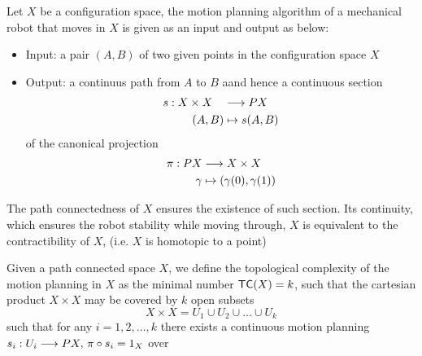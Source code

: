\begin{defn}
    Let $X$ be a configuration space, the motion planning algorithm of a mechanical robot that moves in $X$ is given as an input and output as below:
    \begin{itemize}
        \item Input: a pair $(A,B)$ of two given points in the configuration space $X$
        \item Output: a continuus path from $A$ to $B$ aand hence a continuous section
        \begin{align*}
            s: X \times X \quad & \longrightarrow PX \\
            (A,B)  & \mapsto s(A,B)
        \end{align*}
        of the canonical projection
        \begin{align*}
            \pi: PX  & \longrightarrow X \times X \\
            \gamma & \mapsto (\gamma(0),\gamma(1))
        \end{align*}
    \end{itemize}
\end{defn}

\begin{rem}
    The path connectedness of $X$ ensures the existence of such section. Its continuity, which ensures the robot stability while moving through, $X$  is equivalent to the contractibility of $X$, (i.e. $X$ is homotopic to a
    point)
\end{rem}

\begin{defn}
    Given a path connected space $X$, we define the topological complexity of the motion planning in $X$ as the minimal number $\textsf{TC}(X) = k$, such that the cartesian product $X \times X$ may be covered by $k$ open subsets
    \[
        X \times X  = U_1 \cup U_2 \cup \dots \cup U_k  
    \]
    such that for any $i = 1,2, \ldots, k$ there exists a continuous motion planning $s_i: U_i \longrightarrow PX, \, \pi \circ s_i = 1_X$ over 
\end{defn}
